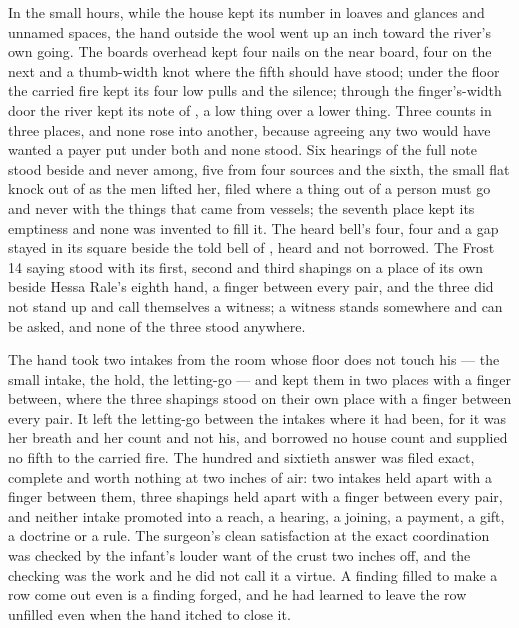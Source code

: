 In the small hours, while the house kept its number in loaves and glances and unnamed spaces, the hand outside the wool went up an inch toward the river's own going. The boards overhead kept four nails on the near board, four on the next and a thumb-width knot where the fifth should have stood; under the floor the carried fire kept its four low pulls and the silence; through the finger's-width door the river kept its note of , a low thing over a lower thing. Three counts in three places, and none rose into another, because agreeing any two would have wanted a payer put under both and none stood. Six hearings of the full note stood beside and never among, five from four sources and the sixth, the small flat knock out of  as the men lifted her, filed where a thing out of a person must go and never with the things that came from vessels; the seventh place kept its emptiness and none was invented to fill it. The heard bell's four, four and a gap stayed in its square beside the told bell of , heard and not borrowed. The Frost 14 saying stood with its first, second and third shapings on a place of its own beside Hessa Rale's eighth hand, a finger between every pair, and the three did not stand up and call themselves a witness; a witness stands somewhere and can be asked, and none of the three stood anywhere.

The hand took two intakes from the room whose floor does not touch his --- the small intake, the hold, the letting-go --- and kept them in two places with a finger between, where the three shapings stood on their own place with a finger between every pair. It left the letting-go between the intakes where it had been, for it was her breath and her count and not his, and borrowed no house count and supplied no fifth to the carried fire. The hundred and sixtieth answer was filed exact, complete and worth nothing at two inches of air: two intakes held apart with a finger between them, three shapings held apart with a finger between every pair, and neither intake promoted into a reach, a hearing, a joining, a payment, a gift, a doctrine or a rule. The surgeon's clean satisfaction at the exact coordination was checked by the infant's louder want of the crust two inches off, and the checking was the work and he did not call it a virtue. A finding filled to make a row come out even is a finding forged, and he had learned to leave the row unfilled even when the hand itched to close it.

